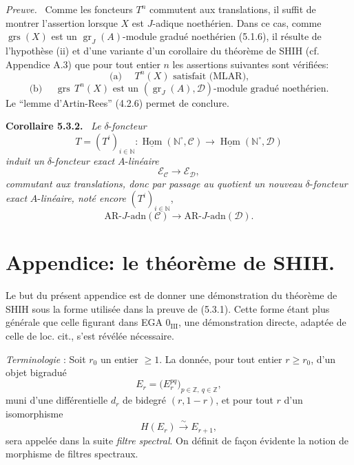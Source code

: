 \documentclass[11pt]{article}
\newenvironment{statement}[1]{\par\medskip\noindent\textbf{#1.}\ }{\par\medskip}
\newenvironment{prooftext}[1][Proof]{\par\noindent\emph{#1.}\ }{\par\medskip}
\DeclareMathOperator{\Hom}{Hom}
\providecommand{\uHom}{\underline{\Hom}}
\providecommand{\gr}{\operatorname{gr}}
\providecommand{\Hom}{\operatorname{Hom}}
\providecommand{\gr}{\operatorname{gr}}
\providecommand{\gr}{\operatorname{gr}}
\providecommand{\grs}{\operatorname{grs}}
\providecommand{\Hom}{\operatorname{Hom}}
\begin{document}
\begin{prooftext}[Preuve]
Comme les foncteurs \(T^n\) commutent aux translations, il suffit de montrer l'assertion lorsque \(X\) est \(J\)-adique noethérien. Dans ce cas, comme \(\grs(X)\) est un \(\gr_J(A)\)-module gradué noethérien (5.1.6), il résulte de l'hypothèse (ii) et d'une variante d'un corollaire du théorème de SHIH (cf. Appendice A.3) que pour tout entier \(n\) les assertions suivantes sont vérifiées:
\[
\text{(a) }\quad T^n(X)\text{ satisfait (MLAR),}
\]
\[
\text{(b) }\quad \grs\,T^n(X)\text{ est un }(\gr_J(A),\mathcal D)\text{-module gradué noethérien.}
\]
Le ``lemme d'Artin-Rees'' (4.2.6) permet de conclure.
\end{prooftext}

\begin{statement}{Corollaire 5.3.2}
\emph{Le} \(\delta\)-\emph{foncteur}
\[
T=(T^i)_{i\in\mathbb N}:\uHom(\mathbb N^\circ,\mathcal C)\longrightarrow\uHom(\mathbb N^\circ,\mathcal D)
\]
\emph{induit un} \(\delta\)-\emph{foncteur exact} \(A\)-\emph{linéaire}
\[
\mathcal E_{\mathcal C}\longrightarrow\mathcal E_{\mathcal D},
\]
\emph{commutant aux translations, donc par passage au quotient un nouveau} \(\delta\)-\emph{foncteur exact} \(A\)-\emph{linéaire, noté encore} \((T^i)_{i\in\mathbb N}\),
\[
\mathrm{AR}\text{-}J\text{-adn}(\mathcal C)\longrightarrow
\mathrm{AR}\text{-}J\text{-adn}(\mathcal D).
\]
\end{statement}

\section*{Appendice: le théorème de SHIH.}

Le but du présent appendice est de donner une démonstration du théorème de SHIH sous la forme utilisée dans la preuve de (5.3.1). Cette forme étant plus générale que celle figurant dans EGA \(0_{\mathrm{III}}\), une démonstration directe, adaptée de celle de loc. cit., s'est révélée nécessaire.

\emph{Terminologie} : Soit \(r_0\) un entier \(\ge1\). La donnée, pour tout entier \(r\ge r_0\), d'un objet bigradué
\[
E_r=\bigl(E_r^{pq}\bigr)_{p\in\mathbb Z,\ q\in\mathbb Z},
\]
muni d'une différentielle \(d_r\) de bidegré \((r,1-r)\), et pour tout \(r\) d'un isomorphisme
\[
H(E_r)\xrightarrow{\sim}E_{r+1},
\]
sera appelée dans la suite \emph{filtre spectral}. On définit de façon évidente la notion de morphisme de filtres spectraux.
\end{document}
